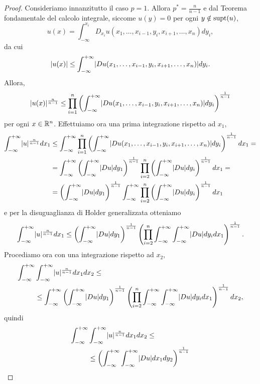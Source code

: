 \begin{proof}
	Consideriamo innanzitutto il caso $p = 1$. Allora $p^\ast = \frac{n}{n-1}$ e dal Teorema fondamentale del calcolo integrale, siccome $u(y) = 0$ per ogni $y \notin \textup{supt}(u)$,
	\[ u(x) = \int_{-\infty}^{x_i} D_{x_i}u(x_1,\dots,x_{i-1},y_i,x_{i+1},\dots,x_n)dy_i, \]
	da cui
	\[ \lvert u(x)\rvert \le \int_{-\infty}^{+\infty} \lvert Du(x_1,\dots,x_{i-1},y_i,x_{i+1},\dots,x_n)\rvert dy_i. \]
	Allora,
	\[ \lvert u(x)\rvert^{\frac{n}{n-1}} \le \prod_{i=1}^{n}\left( \int_{-\infty}^{+\infty} \lvert Du(x_1,\dots,x_{i-1},y_i,x_{i+1},\dots,x_n)\rvert dy_i\right) ^{\frac{1}{n-1}} \]
	per ogni $x \in \mathbb{R}^n$. Effettuiamo ora una prima integrazione rispetto ad $x_1$, 
	\begin{align*}
		\int_{-\infty}^{+\infty} \lvert u\rvert^{\frac{n}{n-1}}dx_1 &\le \int_{-\infty}^{+\infty} \prod_{i=1}^{n}\left( \int_{-\infty}^{+\infty} \lvert Du(x_1,\dots,x_{i-1},y_i,x_{i+1},\dots,x_n)\rvert dy_i\right) ^{\frac{1}{n-1}} dx_1 = \\
		&= \int_{-\infty}^{+\infty} \left( \int_{-\infty}^{+\infty} \lvert Du\rvert dy_1\right) ^{\frac{1}{n-1}} \prod_{i=2}^{n}\left( \int_{-\infty}^{+\infty} \lvert Du\rvert dy_i\right) ^{\frac{1}{n-1}} dx_1 = \\
		& = \left( \int_{-\infty}^{+\infty} \lvert Du\rvert dy_1\right) ^{\frac{1}{n-1}} \int_{-\infty}^{+\infty} \prod_{i=2}^{n}\left( \int_{-\infty}^{+\infty} \lvert Du\rvert dy_i\right) ^{\frac{1}{n-1}} dx_1
	\end{align*}
	e per la disuguaglianza di Holder generalizzata otteniamo 
	\[ \int_{-\infty}^{+\infty} \lvert u\rvert^{\frac{n}{n-1}}dx_1 \le \left( \int_{-\infty}^{+\infty} \lvert Du\rvert dy_1\right) ^{\frac{1}{n-1}} \left(\prod_{i=2}^{n}\int_{-\infty}^{+\infty}  \int_{-\infty}^{+\infty} \lvert Du\rvert dy_idx_1\right) ^{\frac{1}{n-1}}. \]
	Procediamo ora con una integrazione rispetto ad $x_2$,
	\begin{align*}
		\int_{-\infty}^{+\infty}&\int_{-\infty}^{+\infty} \lvert u\rvert^{\frac{n}{n-1}}dx_1 dx_2 \le \\
		&\le \int_{-\infty}^{+\infty}\left( \int_{-\infty}^{+\infty} \lvert Du\rvert dy_1\right) ^{\frac{1}{n-1}} \left(\prod_{i=2}^{n}\int_{-\infty}^{+\infty}  \int_{-\infty}^{+\infty} \lvert Du\rvert dy_idx_1\right) ^{\frac{1}{n-1}}dx_2,
	\end{align*}
	quindi
	\begin{align*}
		\int_{-\infty}^{+\infty}&\int_{-\infty}^{+\infty} \abs{u}^{\frac{n}{n-1}}dx_1 dx_2 \le \\
		&\le \left( \int_{-\infty}^{+\infty} \int_{-\infty}^{+\infty} \abs{Du}dx_1dy_2\right) ^{\frac{1}{n-1}} \\

\end{align*}
\end{proof}
